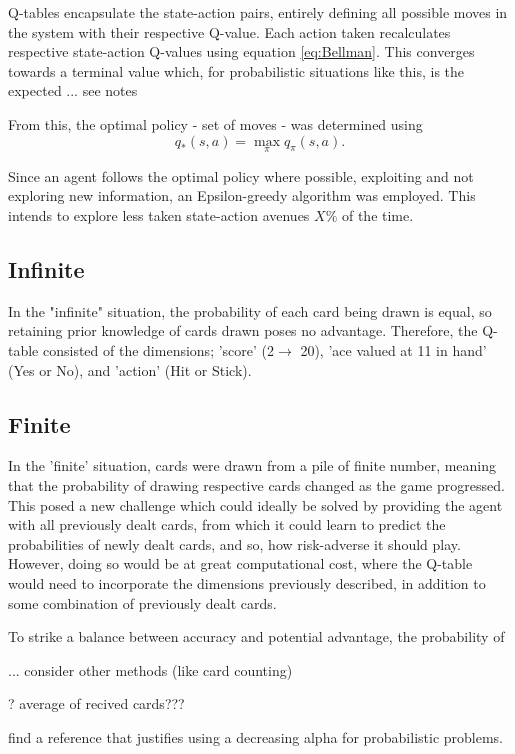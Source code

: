 \smallskip
Q-tables encapsulate the state-action pairs, entirely defining all possible moves in the system with their respective Q-value. Each action taken recalculates respective state-action Q-values using equation \ref{eq:Bellman}. This converges towards a terminal value which, for probabilistic situations like this, is the expected ... see notes

From this, the optimal policy - set of moves - was determined using
\begin{equation}
    q_*(s,a) = \max_{\pi}q_{\pi}(s,a)\text{.}
\end{equation}

\smallskip
Since an agent follows the optimal policy where possible, exploiting  and not exploring new information, an Epsilon-greedy algorithm was employed. This intends to explore less taken state-action avenues \(X\%\) of the time. 

\subsection{Infinite}

In the "infinite" situation, the probability of each card being drawn is equal, so retaining prior knowledge of cards drawn poses no advantage. Therefore, the Q-table consisted of the dimensions; 'score' (2$\rightarrow $ 20), 'ace valued at 11 in hand' (Yes or No), and 'action' (Hit or Stick).


\subsection{Finite}

In the 'finite' situation, cards were drawn from a pile of finite number, meaning that the probability of drawing respective cards changed as the game progressed. This posed a new challenge which could ideally be solved by providing the agent with all previously dealt cards, from which it could learn to predict the probabilities of newly dealt cards, and so, how risk-adverse it should play. However, doing so would be at great computational cost, where the Q-table would need to incorporate the dimensions previously described, in addition to some combination of previously dealt cards. 

To strike a balance between accuracy and potential advantage, the probability of 

... consider other methods (like card counting)

? average of recived cards???

find a reference that justifies using a decreasing alpha for probabilistic problems. 
